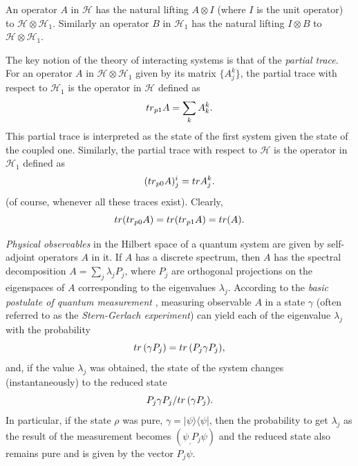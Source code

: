 \documentclass[10pt,a4paper]{amsart}
\def\HC{\mathcal{H}}
\def\tr{\rm{tr}}
\def\ga{\gamma}
\newcommand{\la}{\lambda}
\begin{document}
An operator $A$ in $\HC$ has the natural lifting $A\otimes I$ (where $I$ is the unit operator) to $\HC\otimes \HC_1$.
Similarly an operator $B$ in $\HC_1$ has the natural lifting $I\otimes B$ to $\HC\otimes \HC_1$.

The key notion of the theory of interacting systems is that of the {\it partial trace}. For an operator
$A$ in $\HC \otimes \HC_1$ given by its matrix $\{A^k_j\}$, the partial trace with respect to $\HC_1$
is the operator in $\HC$ defined as
 \begin{equation}
 \label{eqdefparttr}
 {\tr}_{p1} A=\sum_k A^k_k.
 \end{equation}
This  partial trace is interpreted as the state of the first system given the state of the coupled one.
 Similarly, the partial trace with respect to $\HC$ is the operator
 in $\HC_1$ defined as
 \[
 ({\tr}_{p0} A)^i_j={\tr} A^k_j.
 \]
 (of course, whenever all these traces exist).
 Clearly,
 \[
 {\tr} ({\tr}_{p0} A)= {\tr} ({\tr}_{p1} A)= {\tr} (A).
 \]

{\it Physical observables} in the Hilbert space of a quantum system are
given by self-adjoint operators $A$ in it. If $A$ has a discrete spectrum,
then $A$ has the spectral decomposition $A=\sum_j \la_j P_j$, where
 $P_j$ are orthogonal projections on the eigenspaces of $A$ corresponding to
 the eigenvalues $\la_j$. According to the {\it basic postulate of quantum measurement}
 , measuring observable $A$ in a state $\ga$
(often referred to as the {\it Stern-Gerlach experiment})
can yield each of the eigenvalue $\la_j$ with the probability
   \begin{equation}
\label{eqantiunitdress1}
{\tr} \, (\ga P_j)={\tr} \, (P_j \ga P_j),
\end{equation}
 and, if the value $\la_j$ was obtained, the state
of the system changes (instantaneously) to the reduced state
\[
P_j\ga P_j/ {\tr} \, (\ga P_j).
\]
In particular, if the state $\rho$ was pure, $\ga=|\psi\rangle \langle \psi|$, then the
probability to get $\la_j$ as the result of the measurement becomes $(\psi_,P_j\psi)$
and the reduced state also remains pure and is given by the vector $P_j\psi$.
\end{document}
